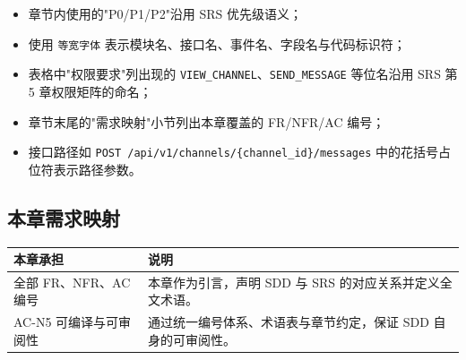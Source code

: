 \begin{itemize}
  \item 章节内使用的"P0/P1/P2"沿用 SRS 优先级语义；
  \item 使用 \texttt{等宽字体} 表示模块名、接口名、事件名、字段名与代码标识符；
  \item 表格中"权限要求"列出现的 \texttt{VIEW\_CHANNEL}、\texttt{SEND\_MESSAGE} 等位名沿用 SRS 第 5 章权限矩阵的命名；
  \item 章节末尾的"需求映射"小节列出本章覆盖的 FR/NFR/AC 编号；
  \item 接口路径如 \texttt{POST /api/v1/channels/\{channel\_id\}/messages} 中的花括号占位符表示路径参数。
\end{itemize}

\subsection{本章需求映射}
\noindent\begin{tabularx}{\textwidth}{L{3cm}Y}
  \toprule
  本章承担 & 说明 \\
  \midrule
  全部 FR、NFR、AC 编号 & 本章作为引言，声明 SDD 与 SRS 的对应关系并定义全文术语。 \\
  AC-N5 可编译与可审阅性 & 通过统一编号体系、术语表与章节约定，保证 SDD 自身的可审阅性。 \\
  \bottomrule
\end{tabularx}

